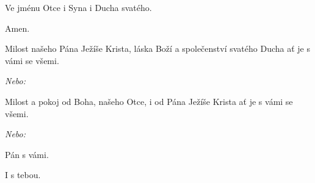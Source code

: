 \mbox{}

Ve jménu Otce i Syna \grealtcross{} i Ducha svatého.

\Rbardot{} Amen.
	   	
\Vbardot{} Milost našeho Pána Ježíše Krista, láska Boží a společenství svatého Ducha ať
je s vámi se všemi.

\textit{\color{red}Nebo:}

\Vbardot{} Milost a pokoj od Boha, našeho Otce, i od Pána Ježíše Krista ať je s vámi se
všemi.
	   	
\textit{\color{red}Nebo:}

\Vbardot{} Pán s vámi.

\Rbardot{} I s tebou.

